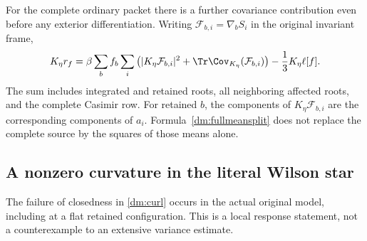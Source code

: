For the complete ordinary packet there is a further covariance contribution even before any exterior differentiation. Writing \(\mathcal F_{b,i}=\nabla_bS_i\) in the original invariant frame,
\begin{equation}
 K_\eta r_f
 =\beta\sum_bf_b\sum_i\left(
       |K_\eta\mathcal F_{b,i}|^2
       +\Tr\Cov_{K_\eta}(\mathcal F_{b,i})\right)
       -\frac13K_\eta\ell[f].
 \label{dm:fullmeansplit}
\end{equation}
The sum includes integrated and retained roots, all neighboring affected roots, and the complete Casimir row. For retained \(b\), the components of \(K_\eta\mathcal F_{b,i}\) are the corresponding components of \(a_i\). Formula~\eqref{dm:fullmeansplit} does not replace the complete source by the squares of those means alone.

\subsection{A nonzero curvature in the literal Wilson star}

The failure of closedness in \eqref{dm:curl} occurs in the actual original model, including at a flat retained configuration. This is a local response statement, not a counterexample to an extensive variance estimate.


